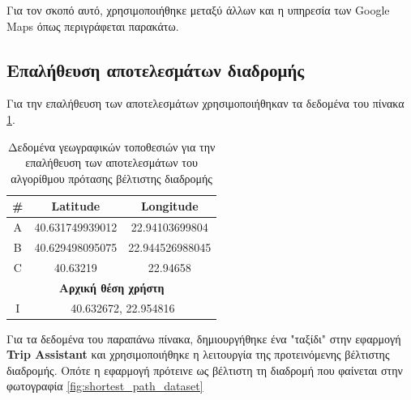 \documentclass[oneside, 12pt]{book}
\begin{document}
Για τον σκοπό αυτό, χρησιμοποιήθηκε μεταξύ άλλων και η υπηρεσία των Google Maps όπως περιγράφεται παρακάτω.
\subsection{Επαλήθευση αποτελεσμάτων διαδρομής}
Για την επαλήθευση των αποτελεσμάτων χρησιμοποιήθηκαν τα δεδομένα 
του πίνακα \ref{table:shortest_places_dataset}.

\begin{table}[H]
\centering
    \begin{tabular}{|c|c|c|}
        \hline
        \textbf{\#} & \textbf{Latitude} & \textbf{Longitude} \\
        \hline
        A & 40.631749939012 & 22.94103699804 \\
        \hline
        B & 40.629498095075 & 22.944526988045 \\
        \hline
        C & 40.63219 & 22.94658 \\
        \hline
        \multicolumn{3}{|c|}{\textbf{Αρχική θέση χρήστη}} \\
        \hline
        I & \multicolumn{2}{|c|}{40.632672, 22.954816}  \\
         \hline
    \end{tabular}
    \caption{Δεδομένα γεωγραφικών τοποθεσιών για την επαλήθευση των αποτελεσμάτων του αλγορίθμου πρότασης βέλτιστης διαδρομής\label{table:shortest_places_dataset}}
\end{table}

Για τα δεδομένα του παραπάνω πίνακα, δημιουργήθηκε ένα "ταξίδι" 
στην εφαρμογή \textbf{Trip Assistant} και χρησιμοποιήθηκε η 
λειτουργία της προτεινόμενης βέλτιστης διαδρομής.
Οπότε η εφαρμογή πρότεινε ως βέλτιστη τη διαδρομή που φαίνεται στην 
φωτογραφία \ref{fig:shortest_path_dataset}
\end{document}
